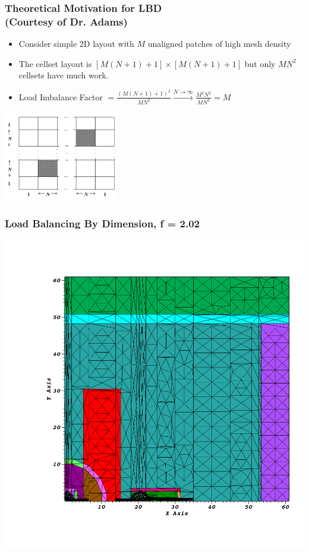 \documentclass[xcolor={usenames,dvipsnames,svgnames,table}]{beamer}
\begin{document}
\begin{frame}[t]\frametitle{Theoretical Motivation for LBD \\ (Courtesy of Dr. Adams)}
  \begin{block}{}
  \begin{itemize}
    \item Consider simple 2D layout with $M$ unaligned patches of high mesh density
    \item The cellset layout is $[M(N+1)+1] \times [M(N+1)+1]$ but only $MN^2$ cellsets have much work.
    \item Load Imbalance Factor $= \frac{\left( M(N+1)+1 \right)^2}{MN^2} \xrightarrow{N\to \infty} \frac{M^2N^2}{MN^2} = M$
  \end{itemize}
  \end{block}
  \begin{center}
    \includegraphics[width=5cm ]{figures/2dgeneral.png}
  \end{center}
\end{frame}

\begin{frame}[t]\frametitle{Load Balancing By Dimension, f = 2.02}
\centering
\includegraphics[scale=0.22]{figures/im12d_newlb.png}
\end{frame}
\end{document}
